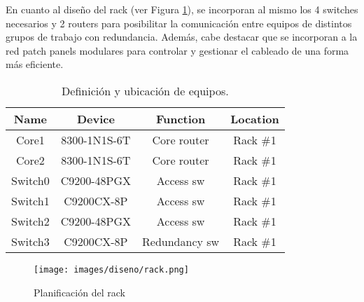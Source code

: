 En cuanto al diseño del rack (ver Figura \ref{fig:rack}), se incorporan al mismo los 4 switches necesarios y 2 routers para posibilitar la comunicación entre equipos de distintos grupos de trabajo con redundancia. Además, cabe destacar que se incorporan a la red patch panels modulares para controlar y gestionar el cableado de una forma más eficiente.

\vspace{3mm}

\begin{table}[h]
    \centering
    \begin{tabular}{|c|c|c|c|}
    \hline
    \textbf{Name} & \textbf{Device} & \textbf{Function} & \textbf{Location} \\ \hline
    Core1 & 8300-1N1S-6T & Core router & Rack \#1 \\ \hline
    Core2 & 8300-1N1S-6T & Core router & Rack \#1 \\ \hline
    Switch0 & C9200-48PGX & Access sw & Rack \#1 \\ \hline
    Switch1 & C9200CX-8P & Access sw & Rack \#1 \\ \hline
    Switch2 & C9200-48PGX & Access sw & Rack \#1 \\ \hline
    Switch3 & C9200CX-8P & Redundancy sw & Rack \#1 \\ \hline
    \end{tabular}
    \caption{Definición y ubicación de equipos.}
\end{table}

    \begin{figure}[h]
    	\centering
    	\texttt{[image: images/diseno/rack.png]}
    	\caption{Planificación del rack}
    	\label{fig:rack}
    \end{figure}

\pagebreak



